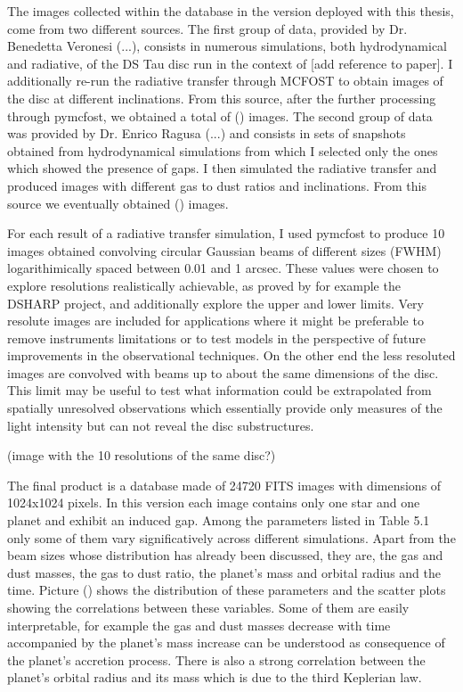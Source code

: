 \documentclass[a4paper,10pt]{report}
\begin{document}
The images collected within the database in the version deployed with this thesis, come from two different sources.
The first group of data, provided by Dr. Benedetta Veronesi (...), consists in numerous simulations,
both hydrodynamical and radiative,
of the DS Tau disc run in the context of [add reference to paper]. 
I additionally re-run the radiative transfer through MCFOST to obtain images of the disc at different inclinations.
From this source, after the further processing through pymcfost, we obtained a total of () images.
The second group of data was provided by Dr. Enrico Ragusa (...) and consists in sets of snapshots
obtained from hydrodynamical simulations from which I selected only the ones which showed the presence of gaps.
I then simulated the radiative transfer and produced images with different gas to dust ratios and inclinations.
From this source we eventually obtained () images.

For each result of a radiative transfer simulation, I used pymcfost to produce 10 images obtained convolving circular 
Gaussian beams of different sizes (FWHM)
logarithimically spaced between 0.01 and 1 arcsec. These values were chosen to explore resolutions
realistically achievable, as proved by for example the DSHARP project, and additionally explore the upper and lower limits.
Very resolute images are included for applications where it might be preferable to remove instruments limitations
or to test models in the perspective of future improvements in the observational techniques. 
On the other end the less resoluted images are convolved with beams up to about the same dimensions of the disc. 
This limit may be useful to test what information could be extrapolated from spatially unresolved observations
which essentially provide only measures of the light intensity but can not reveal the disc substructures.

(image with the 10 resolutions of the same disc?)

The final product is a database made of 24720 FITS images with dimensions of 1024x1024 pixels. In this
version each image contains only one star and one planet and exhibit an induced gap.
Among the parameters listed in Table 5.1 only some of them vary significatively across different simulations.
Apart from the beam sizes whose distribution has already been discussed, they are, the gas and dust masses, the gas to dust ratio, 
the planet's mass and orbital radius and the time. Picture () shows the distribution of these parameters and the scatter
plots showing the correlations between these variables. Some of them are easily interpretable, for example the
gas and dust masses decrease with time accompanied by the planet's mass increase can be understood as consequence of the planet's accretion
process. There is also a strong correlation between the planet's orbital radius and its mass which is due to the third Keplerian law.
\end{document}
